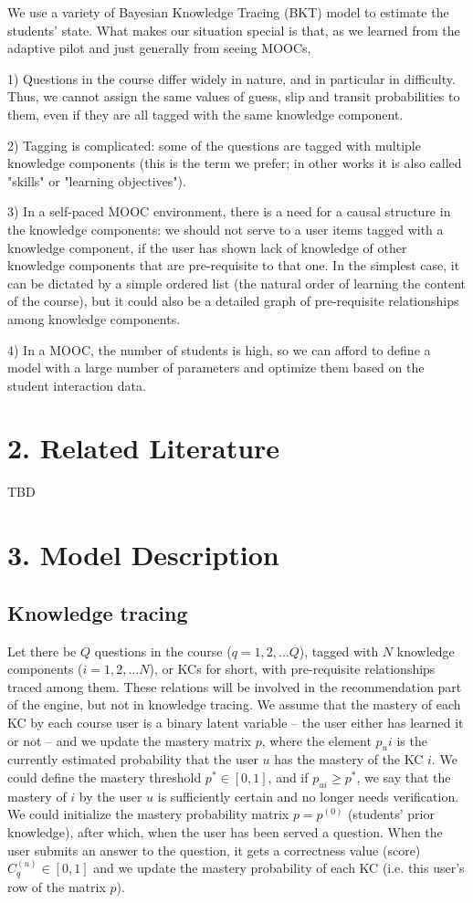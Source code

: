 \documentclass{sigchi}
\newcommand{\1}{\mathbf{1}}
\begin{document}
We use a variety of Bayesian Knowledge Tracing (BKT) model to estimate the students' state. What makes our situation special is that, as we learned from the adaptive pilot and just generally from seeing MOOCs,

1) Questions in the course differ widely in nature, and in particular in difficulty. Thus, we cannot assign the same values of guess, slip and transit probabilities to them, even if they are all tagged with the same knowledge component.

2) Tagging is complicated: some of the questions are tagged with multiple knowledge components (this is the term we prefer; in other works it is also called "skills" or "learning objectives").

3) In a self-paced MOOC environment, there is a need for a causal structure in the knowledge components: we should not serve to a user items tagged with a knowledge component, if the user has shown lack of knowledge of other knowledge components that are pre-requisite to that one. In the simplest case, it can be dictated by a simple ordered list (the natural order of learning the content of the course), but it could also be a detailed graph of pre-requisite relationships among knowledge components.

4) In a MOOC, the number of students is high, so we can afford to define a model with a large number of parameters and optimize them based on the student interaction data.

\section{2. Related Literature}
\label{sec:lit}
 TBD
 

\section{3. Model Description}
\label{sec:model}
\subsection{Knowledge tracing}
Let there be $Q$ questions in the course ($q=1,2,...Q$), tagged with $N$ knowledge components ($i=1,2,... N$), or KCs for short,  with pre-requisite relationships traced among them. These relations will be involved in the recommendation part of the engine, but not in knowledge tracing. We assume that the mastery of each KC by each course user is a binary latent variable -- the user either has learned it or not -- and we update the mastery matrix $p$, where the element $p_ui$ is the currently estimated probability that the user $u$ has the mastery of the KC $i$. We could define the mastery threshold $p^*\in [0,1]$, and if $p_{ui}\geq p^*$, we say that the mastery of $i$ by the user $u$ is sufficiently certain and no longer needs verification.  We could initialize the mastery probability matrix $p=p^{(0)}$ (students' prior knowledge), after which, when the user has been served a question. When the user submits an answer to the question, it gets a correctness value (score) $C_q^{(u)}\in[0,1]$ and we update the mastery probability of each KC (i.e. this user's row of the matrix $p$). 
\end{document}

